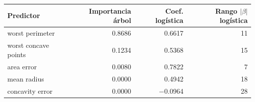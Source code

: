 \begin{tabular}{lrrr}
\toprule
Predictor & Importancia árbol & Coef. logística & Rango $|\beta|$ logística \\
\midrule
worst perimeter & 0.8686 & 0.6617 & 11 \\
worst concave points & 0.1234 & 0.5368 & 15 \\
area error & 0.0080 & 0.7822 & 7 \\
mean radius & 0.0000 & 0.4942 & 18 \\
concavity error & 0.0000 & $-$0.0964 & 28 \\
\bottomrule
\end{tabular}
